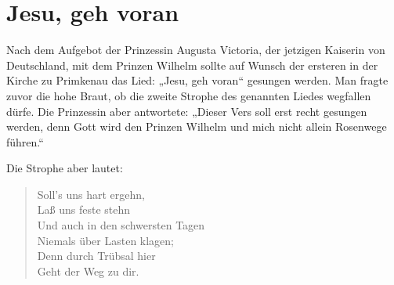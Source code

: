 \chapter[Jesu, geh voran]{Jesu, geh voran}
Nach dem Aufgebot der Prinzessin Augusta Victoria, der jetzigen Kaiserin von Deutschland, mit dem Prinzen Wilhelm sollte auf Wunsch der ersteren in der Kirche zu Primkenau das Lied: „Jesu, geh voran“ gesungen werden. Man fragte zuvor die hohe Braut, ob die zweite Strophe des genannten Liedes wegfallen dürfe. Die Prinzessin aber antwortete: „Dieser Vers soll erst recht gesungen werden, denn Gott wird den Prinzen Wilhelm und mich nicht allein Rosenwege führen.“

Die Strophe aber lautet:

\begin{verse}
Soll’s uns hart ergehn,\\
Laß uns feste stehn\\
Und auch in den schwersten Tagen\\
Niemals über Lasten klagen;\\
Denn durch Trübsal hier\\
Geht der Weg zu dir.
\end{verse}
